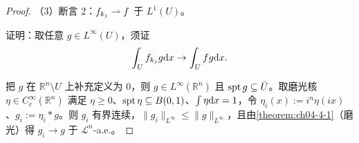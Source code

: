 \documentclass[../../main.tex]{subfiles}%
\begin{document}
\begin{proof}
（3）断言 2：$f_{k_j}\rightharpoonup f$ 于 $L^1(U)$。

证明：取任意 $g\in L^\infty(U)$，须证
\begin{align*}
\int_Uf_{k_j}g\mathrm{d} x\to\int_Ufg\mathrm{d} x .
\end{align*}

把 $g$ 在 $\mathbb{R}^n\setminus U$ 上补充定义为 $0$，则 $g\in L^\infty(\mathbb{R}^n)$ 且 $\operatorname{spt} g\subseteq\bar U$。取磨光核 $\eta\in C_c^\infty(\mathbb{R}^n)$ 满足 $\eta\geqslant0$、$\operatorname{spt}\eta\subseteq B(0,1)$、$\int\eta\mathrm{d} x=1$，令 $\eta_i(x):=i^n\eta(ix)$、$g_i:=\eta_i*g$。则 $g_i$ 有界连续，$\lVert g_i\rVert_{L^\infty}\leqslant\lVert g\rVert_{L^\infty}$，且由\cref{theorem:ch04-4-1}（磨光）得 $g_i\to g$ 于 $\mathcal{L}^n$-a.e.。%


\end{proof}
\end{document}
